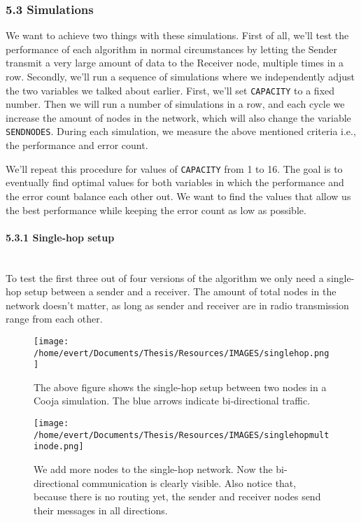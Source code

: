 \subsubsection{5.3 Simulations}\label{simulations}

We want to achieve two things with these simulations. First of all,
we'll test the performance of each algorithm in normal circumstances by
letting the Sender transmit a very large amount of data to the Receiver
node, multiple times in a row. Secondly, we'll run a sequence of
simulations where we independently adjust the two variables we talked
about earlier. First, we'll set \texttt{CAPACITY} to a fixed number.
Then we will run a number of simulations in a row, and each cycle we
increase the amount of nodes in the network, which will also change the
variable \texttt{SENDNODES}. During each simulation, we measure the
above mentioned criteria i.e., the performance and error count.

We'll repeat this procedure for values of \texttt{CAPACITY} from 1 to
16. The goal is to eventually find optimal values for both variables in
which the performance and the error count balance each other out. We
want to find the values that allow us the best performance while keeping
the error count as low as possible.

\paragraph{5.3.1 Single-hop setup\\\\}\label{single-hop-setup}

To test the first three out of four versions of the algorithm we only
need a single-hop setup between a sender and a receiver. The amount of
total nodes in the network doesn't matter, as long as sender and
receiver are in radio transmission range from each other.

\begin{figure}[htbp]
\centering
\texttt{[image: /home/evert/Documents/Thesis/Resources/IMAGES/singlehop.png]}
\caption{The above figure shows the single-hop setup between two nodes in a Cooja simulation. The blue arrows indicate bi-directional traffic.}
\end{figure}

\begin{figure}[htbp]
\centering
\texttt{[image: /home/evert/Documents/Thesis/Resources/IMAGES/singlehopmultinode.png]}
\caption{We add more nodes to the single-hop network. Now the bi-directional communication is clearly visible. Also notice that, because there is no routing yet, the sender and receiver nodes send their messages in all directions.}
\end{figure}

